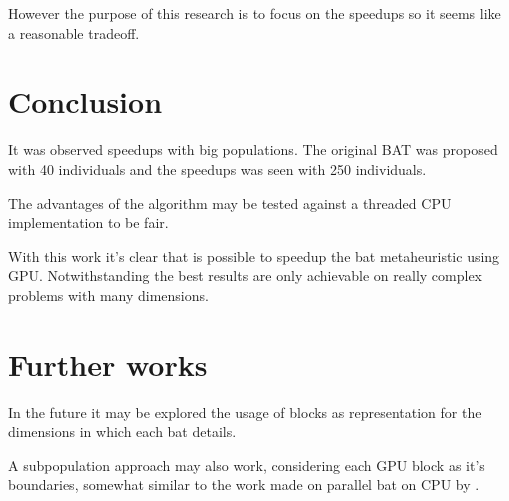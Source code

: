 \documentclass[conference]{IEEEtran}
\begin{document}
However the purpose of this research is to focus on the speedups so it
seems like a reasonable tradeoff.


\section{Conclusion} %
It was observed speedups with big populations. The original BAT was
proposed with 40 individuals and the speedups was seen with 250
individuals.

The advantages of the algorithm may be tested against a threaded CPU
implementation to be fair.

With this work it's clear that is possible to speedup the bat
metaheuristic using GPU. Notwithstanding the best results are only
achievable on really complex problems with many dimensions.

\section{Further works} %
In the future it may be explored the usage of blocks as representation
for the dimensions in which each bat details.

A subpopulation approach may also work, considering each GPU block as
it's boundaries, somewhat similar to the work made on parallel bat on
CPU by \cite{paralellCPU}.
\end{document}
